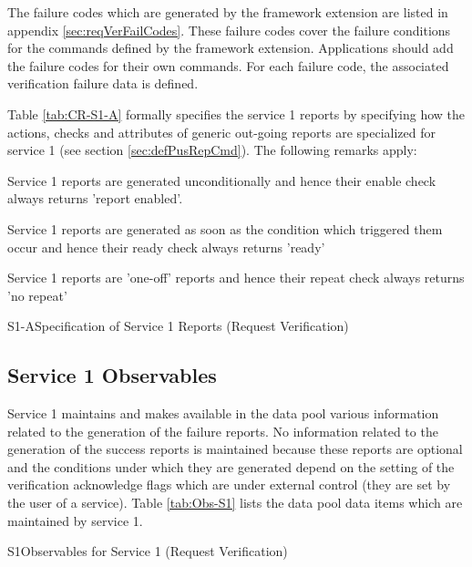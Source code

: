 \documentclass[a4paper,10pt]{article}
\newenvironment{fw_itemize}						%
{\begin{itemize}
  \setlength{\itemsep}{1mm}
  \setlength{\parskip}{0pt}
  \setlength{\parsep}{0pt}}
{\end{itemize}}
\newenvironment{cr_rep}[2]
{
\begin{longtable}{|c|p{10cm}|}
\caption{#2} \label{tab:CR-#1}\\
\hline
\rowcolor{light-gray}
\DTLforeach*{dbRep}{\att=Attribute,\attValue=#1}
{\DTLiffirstrow{}{\\\hline}\att & \attValue}\\\hline
}
{\end{longtable}}
\newenvironment{cr_obs}[2]
{
\begin{longtable}{|l|p{9.5cm}|}
\caption{#2}\label{tab:Obs-#1} \\
\hline
\rowcolor{light-gray}
\textbf{Name} & \textbf{Description}\\
\hline\hline
\endfirsthead
\rowcolor{light-gray}
\textbf{Name} & \textbf{Description}\\
\hline\hline
\endhead
\DTLforeach*[\DTLiseq{\cat}{#1}]{dbObs}{\cat=Category,\name=Name,\desc=Desc}
{\DTLiffirstrow{}{\\\hline}\texttt{\name} & \desc}\\\hline
}
{\end{longtable}}
\begin{document}
The failure codes which are generated by the framework extension are listed in appendix \ref{sec:reqVerFailCodes}. These failure codes cover the failure conditions for the commands defined by the framework extension. Applications should add the failure codes for their own commands. For each failure code, the associated verification failure data is defined.

Table \ref{tab:CR-S1-A} formally specifies the service 1 reports by specifying how the actions, checks and attributes of generic out-going reports are specialized for service 1 (see section \ref{sec:defPusRepCmd}). The following remarks apply: 

\begin{fw_itemize}
\item Service 1 reports are generated unconditionally and hence their enable check always returns 'report enabled'.
\item Service 1 reports are generated as soon as the condition which triggered them occur and hence their ready check always returns 'ready'
\item Service 1 reports are 'one-off' reports and hence their repeat check always returns 'no repeat'
\end{fw_itemize}

\newpage
\begin{cr_rep}{S1-A}{Specification of Service 1 Reports (Request Verification)}
\end{cr_rep}


\subsection{Service 1 Observables}\label{sec:serv1Obs}
Service 1 maintains and makes available in the data pool various information related to the generation of the failure reports. No information related to the generation of the success reports is maintained because these reports are optional and the conditions under which they are generated depend on the setting of the verification acknowledge flags which are under external control (they are set by the user of a service). Table \ref{tab:Obs-S1} lists the data pool data items which are maintained by service 1.

\begin{cr_obs}{S1}{Observables for Service 1 (Request Verification)}
\end{cr_obs}
\end{document}
